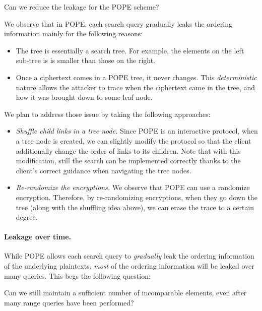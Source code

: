 \begin{question}
Can we reduce the leakage for the POPE scheme?
\end{question}

We observe that in POPE, each search query gradually leaks the ordering
information mainly for the following reasons: 

\begin{itemize}
\item The tree is essentially a search tree. For example, the elements on the
  left sub-tree is is smaller than those on the right.
 
\item Once a ciphertext comes in a POPE tree, it never changes. This {\em
  deterministic} nature allows the attacker to trace when the ciphertext came
  in the tree, and how it was brought down to some leaf node.  
\end{itemize}

We plan to address those issue by taking the following approaches:

\begin{itemize}
\item {\it Shuffle child links in a tree node.} Since POPE is an interactive
  protocol, when a tree node is created, we can slightly modify the protocol so
    that the client additionally change the order of links to its children.
    Note that with this modification, still the search can be implemented
    correctly thanks to the client's correct guidance when navigating the tree
    nodes. 
    
 
\item  {\it Re-randomize the encryptions.} We observe that POPE can use a
  randomize encryption. Therefore, by re-randomizing encryptions, when they go
    down the tree (along with the shuffling idea above), we can erase the trace
    to a certain degree. 
\end{itemize}



\paragraph{Leakage over time.}
While POPE allows each search query to {\it gradually} leak the ordering
information of the underlying plaintexts, {\em most} of the ordering
information will be leaked over many queries. This begs the following question: 

\begin{question}
Can we still maintain a sufficient number of incomparable elements, even after
  many range queries have been performed?  
\end{question}


